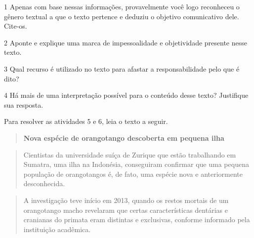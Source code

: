 
\num{1} Apenas com base nessas informações, provavelmente você logo
reconheceu o gênero textual a que o texto pertence e deduziu o objetivo
comunicativo dele. Cite-os.


\num{2} Aponte e explique uma marca de impessoalidade e objetividade
presente nesse texto.


\num{3} Qual recurso é utilizado no texto para afastar a
responsabilidade pelo que é dito?


\num{4} Há mais de uma interpretação possível para o conteúdo desse
texto? Justifique sua resposta.


Para resolver as atividades 5 e 6, leia o texto a seguir.

\begin{quote}
\textbf{Nova espécie de orangotango descoberta em pequena ilha}
\end{quote}

\begin{quote}
Cientistas da universidade suíça de Zurique que estão trabalhando em
Sumatra, uma ilha na Indonésia, conseguiram confirmar que uma pequena
população de orangotangos é, de fato, uma espécie nova e anteriormente
desconhecida.
\end{quote}

\begin{quote}
A investigação teve início em 2013, quando os restos mortais de um
orangotango macho revelaram que certas características dentárias e
cranianas do primata eram distintas e exclusivas, conforme informado
pela instituição acadêmica.
\end{quote}

